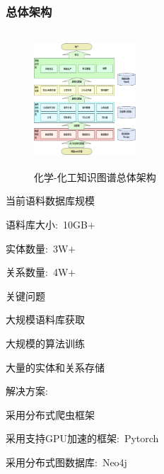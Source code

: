 \begin{frame}
	\frametitle{总体架构}
\begin{minipage}[b]{0.48\textwidth}
\begin{figure}[h!]
\centering
\includegraphics[height=2.00in,width=1.50in,viewport=0 0 95 110,clip]{Figures/KG_Chem-Frame_Relation.png}
\caption{\tiny 化学-化工知识图谱总体架构}%
\label{Fig:KG_Chem-Frame_Relation}
\end{figure}
\end{minipage}
\begin{minipage}[c]{0.50\textwidth}
\vspace*{-2.15in}
	当前语料数据库规模
\begin{itemize}%
 {\fontsize{7.5pt}{6.0pt}\selectfont
 \item 语料库大小:~\textrm{10GB$+$}
 \item 实体数量:~\textrm{3W$+$}
 \item 关系数量:~\textrm{4W$+$}}
\end{itemize}
关键问题
\begin{itemize}%
 {\fontsize{7.5pt}{6.0pt}\selectfont
 \item 大规模语料库获取
 \item 大规模的算法训练
 \item 大量的实体和关系存储}
\end{itemize}
解决方案:
\begin{itemize}%
 {\fontsize{7.5pt}{6.0pt}\selectfont
\item 采用分布式爬虫框架
\item 采用支持\textrm{GPU}加速的框架:~\textrm{Pytorch}
\item 采用分布式图数据库:~\textrm{Neo4j}}
\end{itemize}
\end{minipage}
\end{frame}

